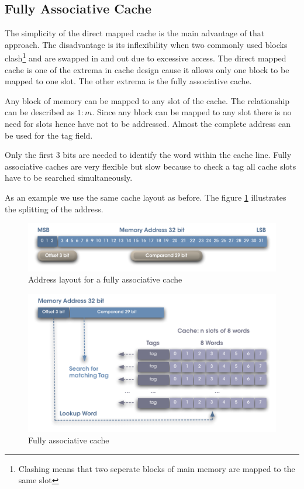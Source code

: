 \documentclass[DIV10, abstracton, openright, footsepline, headsepline, twoside, 9pt,
bigheadings]{scrreprt}
\begin{document}
\subsection{Fully Associative Cache}
The simplicity of the direct mapped cache is the main advantage of that
approach. The disadvantage is its inflexibility when two commonly used blocks
clash\footnote{Clashing means that two seperate blocks of main memory are mapped
to the same slot} and are swapped in and out due to excessive access. The direct
mapped cache is one of the extrema in cache design cause it allows only one
block to be mapped to one slot. The other extrema is the fully associative
cache.

Any block of memory can be mapped to any slot of the cache. The
relationship can be described as $1:m$. Since  any block can be mapped to any slot
 there is no need for slots hence have not to be addressed. Almost the complete
address can be used for the tag field.

Only the first 3 bits are needed to identify the word within the
cache line. Fully associative caches are very flexible but slow because to check
a tag all cache slots have to be searched simultaneously.

As an example we use the same cache layout as before. The figure
\ref{fig:addsplit_fa} illustrates the splitting of the address.

\begin{figure}[H]
\centering
\includegraphics[width=\textwidth]{diagramme/addsplit_fa}
\caption{Address layout for a fully associative cache}
\label{fig:addsplit_fa}
\end{figure}



\begin{figure}[H]
\centering
\includegraphics[width=\textwidth]{diagramme/fa_cache}
\caption{Fully associative cache}
\label{fig:fa_cache}
\end{figure}
\end{document}
